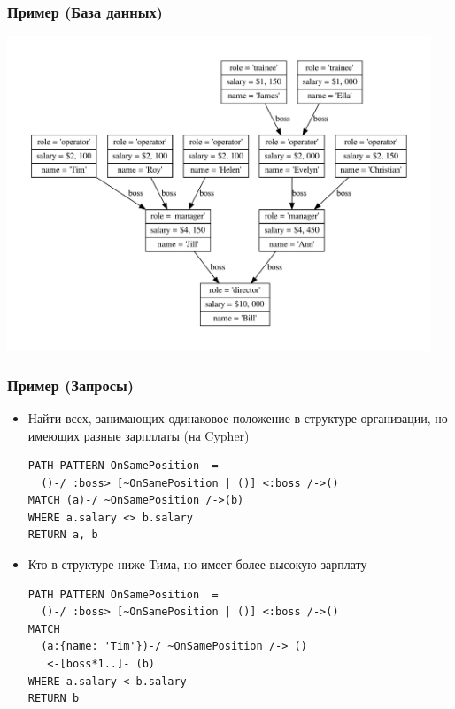 \documentclass{beamer}
\begin{document}
\begin{frame}[fragile]
  \frametitle{Пример (База данных)}
  \includegraphics[width=0.95\textwidth]{figures/cfpq_example.pdf}
\end{frame}


\begin{frame}[fragile]
  \frametitle{Пример (Запросы)}
  \begin{itemize}
  \item Найти всех, занимающих одинаковое положение в структуре организации, но имеющих разные зарпллаты (на Cypher)
    \begin{verbatim}
PATH PATTERN OnSamePosition  = 
  ()-/ :boss> [~OnSamePosition | ()] <:boss /->()
MATCH (a)-/ ~OnSamePosition /->(b)
WHERE a.salary <> b.salary
RETURN a, b
    \end{verbatim}
\pause
  \item Кто в структуре ниже Тима, но имеет более высокую зарплату
    \begin{verbatim}
PATH PATTERN OnSamePosition  = 
  ()-/ :boss> [~OnSamePosition | ()] <:boss /->()
MATCH 
  (a:{name: 'Tim'})-/ ~OnSamePosition /-> () 
   <-[boss*1..]- (b)
WHERE a.salary < b.salary
RETURN b
    \end{verbatim}

\end{itemize}

\end{frame}
\end{document}
